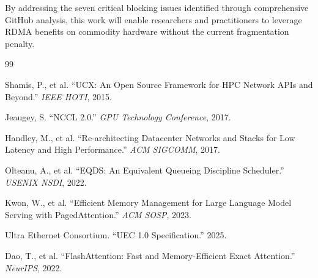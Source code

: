 \documentclass[11pt,letterpaper]{article}
\theoremstyle{definition}
\begin{document}
By addressing the seven critical blocking issues identified through comprehensive GitHub analysis, this work will enable researchers and practitioners to leverage RDMA benefits on commodity hardware without the current fragmentation penalty.



\begin{thebibliography}{99}

Shamis, P., et al. ``UCX: An Open Source Framework for HPC Network APIs and Beyond.'' \textit{IEEE HOTI}, 2015.

Jeaugey, S. ``NCCL 2.0.'' \textit{GPU Technology Conference}, 2017.

Handley, M., et al. ``Re-architecting Datacenter Networks and Stacks for Low Latency and High Performance.'' \textit{ACM SIGCOMM}, 2017.

Olteanu, A., et al. ``EQDS: An Equivalent Queueing Discipline Scheduler.'' \textit{USENIX NSDI}, 2022.

Kwon, W., et al. ``Efficient Memory Management for Large Language Model Serving with PagedAttention.'' \textit{ACM SOSP}, 2023.

Ultra Ethernet Consortium. ``UEC 1.0 Specification.'' 2025.

Dao, T., et al. ``FlashAttention: Fast and Memory-Efficient Exact Attention.'' \textit{NeurIPS}, 2022.

\end{thebibliography}
\end{document}
